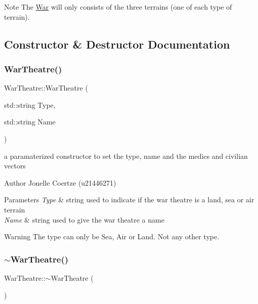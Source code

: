 \begin{DoxyNote}{Note}
The \mbox{\hyperlink{class_war}{War}} will only consists of the three terrains (one of each type of terrain). 
\end{DoxyNote}


\subsection{Constructor \& Destructor Documentation}
\mbox{\label{class_war_theatre_ac1dc683301091ecc993f5f8c43a076ec}} 
\subsubsection{\texorpdfstring{WarTheatre()}{WarTheatre()}}
{\footnotesize\ttfamily War\+Theatre\+::\+War\+Theatre (\begin{DoxyParamCaption}\item[{std\+::string}]{Type,  }\item[{std\+::string}]{Name }\end{DoxyParamCaption})}



a paramaterized constructor to set the type, name and the medics and civilian vectors 

\begin{DoxyAuthor}{Author}
Jonelle Coertze (u21446271) 
\end{DoxyAuthor}

\begin{DoxyParams}{Parameters}
{\em Type} & string used to indicate if the war theatre is a land, sea or air terrain \\
\hline
{\em Name} & string used to give the war theatre a name \\
\hline
\end{DoxyParams}
\begin{DoxyWarning}{Warning}
The type can only be Sea, Air or Land. Not any other type. 
\end{DoxyWarning}
\mbox{\label{class_war_theatre_a28324e2234a88933e1697c0f7f9ff222}} 
\subsubsection{\texorpdfstring{$\sim$WarTheatre()}{~WarTheatre()}}
{\footnotesize\ttfamily War\+Theatre\+::$\sim$\+War\+Theatre (\begin{DoxyParamCaption}{ }\end{DoxyParamCaption})}



